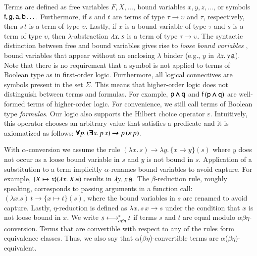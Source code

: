 Terms are defined as free variables $F, X, \ldots$, bound variables $x, y, z,
\dotsc$, or symbols $\mathsf{f}, \mathsf{g},\allowbreak \mathsf{a},\allowbreak \mathsf{b}
\dotsc$. Furthermore, if $s$ and $t$ are terms of type $\tau \rightarrow
\upsilon$ and $\tau$, respectively, then $s \, t$ is a term of type $\upsilon$.
Lastly, if $x$ is a bound variable of type $\tau$ and $s$ is a term of type
$\upsilon$, then $\lambda$-abstraction $\lambda x.\> s$ is a term of type $\tau
\rightarrow \upsilon$. The syntactic distinction between free and bound
variables gives rise to \emph{loose bound variables} \cite{tn-93-patterns},
bound variables that appear without an enclosing $\lambda$ binder  (e.g., $y$ in
$\lambda x.\> y \, \mathsf{a}$). Note that there is no requirement that a
symbol is not applied to terms of Boolean type as in first-order logic.
Furthermore, all logical connectives are symbols present in the set $\Sigma$.
This means that higher-order logic does not distinguish between terms and
formulas. For example, $\mathsf{p} \pmb{\land} \mathsf{q}$ and $\mathsf{f} \, (\mathsf{p} \pmb{\land}
\mathsf{q})$ are well-formed terms of higher-order logic. For convenience, we still
call terms of Boolean type \emph{formulas}. Our logic also supports the Hilbert
choice operator $\varepsilon$. Intuitively, this operator chooses an arbitrary value that
satisfies a predicate and it is axiomatized as follows: $\pmb{\forall} p. \, (\pmb{\exists}
x. \, p \, x) \pmb{\rightarrow} p \, (\varepsilon \, p)$.


With $\alpha$-conversion we assume the rule $(\lambda x. \, s) \longrightarrow
\lambda y. \, \{x \mapsto y\}(s)$ where $y$ does not occur as a loose bound variable in $s$
and $y$ is not bound in $s$. Application of a substitution to a term
implicitly $\alpha$-renames bound variables to avoid capture.  For example, $\{X
\mapsto x\}(\lambda x.\> X \, \mathsf{a})$ results in $\lambda y.\> x \, \mathsf{a}$. The
$\beta$-reduction rule, roughly speaking, corresponds to passing arguments in a
function call: $(\lambda x. s) \, t \longrightarrow \{x \mapsto t\} (s)$, where
the bound variables in $s$ are renamed to avoid capture. Lastly,
$\eta$-reduction is defined as $\lambda x.\, s \, x \longrightarrow s$ under the
condition that $x$ is not loose bound in $x$. We write $s \longleftrightarrow^*_{\alpha\beta\eta} t$ if terms
$s$ and $t$ are equal modulo $\alpha\beta\eta$-conversion. Terms that are
convertible with respect to any of the rules form equivalence classes. Thus, we
also say that $\alpha$($\beta\eta$)-convertible terms are
$\alpha$($\beta\eta$)-equivalent. 

